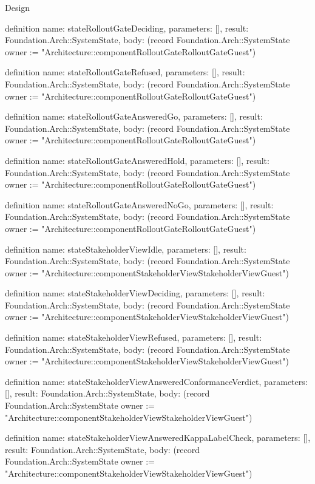 \begin{lexlean}{Design}
\begin{semanticmodule}
definition{
  name: stateRolloutGateDeciding,
  parameters: [],
  result: Foundation.Arch::SystemState,
  body: (record Foundation.Arch::SystemState {owner := "Architecture::componentRolloutGateRolloutGateGuest"})
}

definition{
  name: stateRolloutGateRefused,
  parameters: [],
  result: Foundation.Arch::SystemState,
  body: (record Foundation.Arch::SystemState {owner := "Architecture::componentRolloutGateRolloutGateGuest"})
}

definition{
  name: stateRolloutGateAnsweredGo,
  parameters: [],
  result: Foundation.Arch::SystemState,
  body: (record Foundation.Arch::SystemState {owner := "Architecture::componentRolloutGateRolloutGateGuest"})
}

definition{
  name: stateRolloutGateAnsweredHold,
  parameters: [],
  result: Foundation.Arch::SystemState,
  body: (record Foundation.Arch::SystemState {owner := "Architecture::componentRolloutGateRolloutGateGuest"})
}

definition{
  name: stateRolloutGateAnsweredNoGo,
  parameters: [],
  result: Foundation.Arch::SystemState,
  body: (record Foundation.Arch::SystemState {owner := "Architecture::componentRolloutGateRolloutGateGuest"})
}

definition{
  name: stateStakeholderViewIdle,
  parameters: [],
  result: Foundation.Arch::SystemState,
  body: (record Foundation.Arch::SystemState {owner := "Architecture::componentStakeholderViewStakeholderViewGuest"})
}

definition{
  name: stateStakeholderViewDeciding,
  parameters: [],
  result: Foundation.Arch::SystemState,
  body: (record Foundation.Arch::SystemState {owner := "Architecture::componentStakeholderViewStakeholderViewGuest"})
}

definition{
  name: stateStakeholderViewRefused,
  parameters: [],
  result: Foundation.Arch::SystemState,
  body: (record Foundation.Arch::SystemState {owner := "Architecture::componentStakeholderViewStakeholderViewGuest"})
}

definition{
  name: stateStakeholderViewAnsweredConformanceVerdict,
  parameters: [],
  result: Foundation.Arch::SystemState,
  body: (record Foundation.Arch::SystemState {owner := "Architecture::componentStakeholderViewStakeholderViewGuest"})
}

definition{
  name: stateStakeholderViewAnsweredKappaLabelCheck,
  parameters: [],
  result: Foundation.Arch::SystemState,
  body: (record Foundation.Arch::SystemState {owner := "Architecture::componentStakeholderViewStakeholderViewGuest"})
}


\end{semanticmodule}
\end{lexlean}
